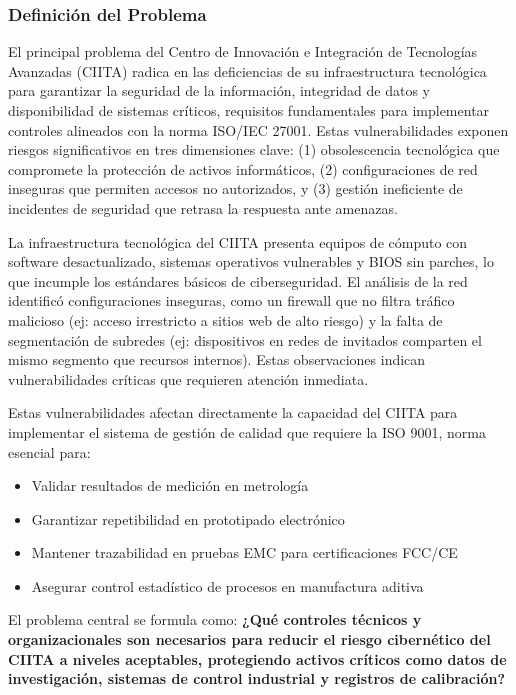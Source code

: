 \subsubsection{Definición del Problema}
El principal problema del Centro de Innovación e Integración de Tecnologías Avanzadas (CIITA) radica en las deficiencias de su infraestructura tecnológica para garantizar la seguridad de la información, integridad de datos y disponibilidad de sistemas críticos, requisitos fundamentales para implementar controles alineados con la norma ISO/IEC 27001. Estas vulnerabilidades exponen riesgos significativos en tres dimensiones clave: (1) obsolescencia tecnológica que compromete la protección de activos informáticos, (2) configuraciones de red inseguras que permiten accesos no autorizados, y (3) gestión ineficiente de incidentes de seguridad que retrasa la respuesta ante amenazas.

La infraestructura tecnológica del CIITA presenta equipos de cómputo con software desactualizado, sistemas operativos vulnerables y BIOS sin parches, lo que incumple los estándares básicos de ciberseguridad. El análisis de la red identificó configuraciones inseguras, como un firewall que no filtra tráfico malicioso (ej: acceso irrestricto a sitios web de alto riesgo) y la falta de segmentación de subredes (ej: dispositivos en redes de invitados comparten el mismo segmento que recursos internos). Estas observaciones indican vulnerabilidades críticas que requieren atención inmediata.

Estas vulnerabilidades afectan directamente la capacidad del CIITA para implementar el sistema de gestión de calidad que requiere la ISO 9001, norma esencial para:
\begin{itemize}
	\item Validar resultados de medición en metrología
	\item Garantizar repetibilidad en prototipado electrónico
	\item Mantener trazabilidad en pruebas EMC para certificaciones FCC/CE
	\item Asegurar control estadístico de procesos en manufactura aditiva
\end{itemize}

El problema central se formula como: \textbf{¿Qué controles técnicos y organizacionales son necesarios para reducir el riesgo cibernético del CIITA a niveles aceptables, protegiendo activos críticos como datos de investigación, sistemas de control industrial y registros de calibración?}


